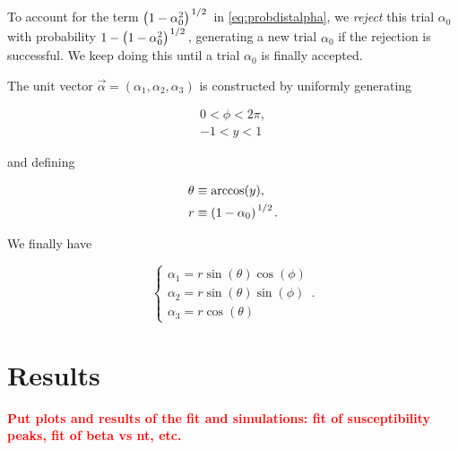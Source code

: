 \documentclass[reqno,12pt]{article}
\numberwithin{equation}{section}
\newcommand{\red}[1]{\textbf{\textcolor{red}{#1}}}
\begin{document}
To account for the term $\qty(1 - \alpha_0^2)^{\flatfrac{1}{2}}$ in \eqref{eq:probdistalpha}, we \textit{reject} this trial
$\alpha_0$ with probability $1 - \qty(1 - \alpha_0^2)^{\flatfrac{1}{2}}$, generating a new trial $\alpha_0$ if 
the rejection is successful. We keep doing this until a trial $\alpha_0$ is finally accepted. 

The unit vector $\vec{\alpha} = (\alpha_1, \alpha_2, \alpha_3)$ is constructed by uniformly generating 

\begin{gather}
	0 < \phi < 2\pi, \\
	-1 < y < 1
\end{gather}

and defining 

\begin{align}
	\theta &\equiv \arccos(y), \\
	r &\equiv \qty(1 - \alpha_0)^{\flatfrac{1}{2}}.
\end{align}

We finally have

\begin{equation}
	\begin{cases}
		\alpha_1 = r \sin(\theta) \cos(\phi) \\
		\alpha_2 = r \sin(\theta) \sin(\phi) \\
		\alpha_3 = r \cos(\theta)
	\end{cases}.
\end{equation}


\section{Results}
\red{Put plots and results of the fit and simulations: fit of susceptibility peaks, fit of beta vs nt, etc.}

\printbibliography
\end{document}
